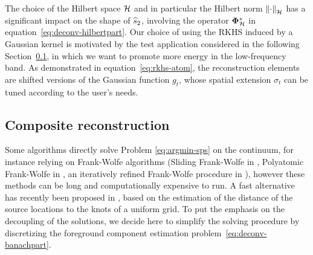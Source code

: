 \documentclass[12pt]{article}
\begin{document}
        {
        \begin{remark}
            The choice of the Hilbert space $\mathcal{H}$ and in particular the Hilbert norm $\left\lVert\cdot\right\rVert_{\mathcal{H}}$ has a significant impact on the shape of $\widehat{s}_2$, involving the operator $\bm{\Phi}_\mathcal{H}^*$ in equation~\eqref{eq:deconv-hilbertpart}. %
            Our choice of using the RKHS induced by a Gaussian kernel is motivated by the test application considered in the following Section~\ref{sec:comp:reco}, in which we want to promote more energy in the low-frequency band. %
             As demonstrated in equation~\eqref{eq:rkhs-atom}, the reconstruction elements are shifted versions of the Gaussian function $g_t$, whose spatial extension $\sigma_t$ can be tuned according to the user's needs.
        \end{remark}
        }
        
        
    \subsection{Composite reconstruction}
    \label{sec:comp:reco}

        Some algorithms directly solve Problem \eqref{eq:argmin-sps} on the continuum, for instance relying on Frank-Wolfe algorithms (Sliding Frank-Wolfe in \cite{denoyelle2019sliding}, Polyatomic Frank-Wolfe in \cite{jarret_grid_2025}, an iteratively refined Frank-Wolfe procedure in \cite{flinth2023grid}), however these methods can be long and computationally expensive to run. A fast alternative has recently been proposed in \cite{poon2025srlasso}, based on the estimation of the distance of the source locations to the knots of a uniform grid.
        To put the emphasis on the decoupling of the solutions, we decide here to simplify the solving procedure by discretizing the foreground component estimation problem~\eqref{eq:deconv-banachpart}.
        
\end{document}
